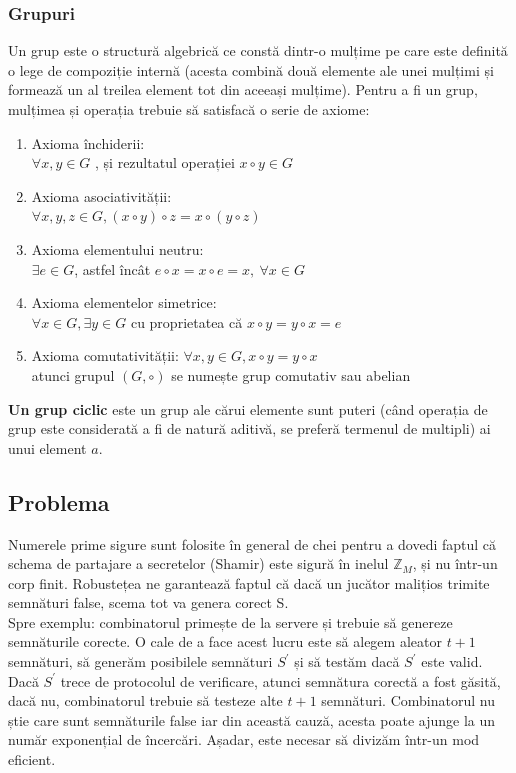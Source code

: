 \documentclass[12pt, oneside]{book}
\begin{document}
\subsubsection{Grupuri}
Un grup este o structură algebrică ce constă dintr-o mulțime pe care este definită o lege de compoziție internă (acesta combină două elemente ale unei mulțimi și formează un al treilea element tot din aceeași mulțime). Pentru a fi un grup, mulțimea și operația trebuie să satisfacă o serie de axiome:
\begin{enumerate}
\item Axioma închiderii: \\
$\forall x,  y \in G$  , și rezultatul operației $x \circ y \in G$

\item Axioma asociativității: \\
$\forall x,y,z \in G, (x \circ y) \circ z = x \circ (y \circ z)$

\item Axioma elementului neutru: \\
$\exists e \in G$, astfel încât $e \circ x = x \circ e = x, \ \forall x \in G$

\item Axioma elementelor simetrice: \\
$\forall x \in G, \exists y \in G$ cu proprietatea că $x \circ y = y \circ x = e$

\item Axioma comutativității:
$\forall x,y \in G, x \circ y = y \circ x$ \\
atunci grupul $(G,\circ )$ se numește grup comutativ sau abelian



\end{enumerate}
\textbf{Un grup ciclic} este un grup ale cărui elemente sunt puteri (când operația de grup este considerată a fi de natură aditivă, se preferă termenul de multipli) ai unui element $a$. 

\subsection{Problema}
Numerele prime sigure sunt folosite în general de chei pentru a dovedi faptul că schema de partajare a secretelor (Shamir) este sigură în inelul $\mathbb{Z}_M$, și nu într-un corp finit. Robustețea ne garantează faptul că dacă un jucător malițios trimite semnături false, scema tot va genera corect S. \\
Spre exemplu: combinatorul primește de la servere și trebuie să genereze semnăturile corecte. O cale de a face acest lucru este să alegem aleator $t+1$ semnături, să generăm posibilele semnături $S^{'}$ și să testăm dacă $S^{'}$ este valid. Dacă $S^{'}$ trece de protocolul de verificare, atunci semnătura corectă a fost găsită, dacă nu, combinatorul trebuie să testeze alte $t+1$ semnături. Combinatorul nu știe care sunt semnăturile false iar din această cauză, acesta poate ajunge la un număr exponențial de încercări. Așadar, este necesar să divizăm într-un mod eficient.
\end{document}
